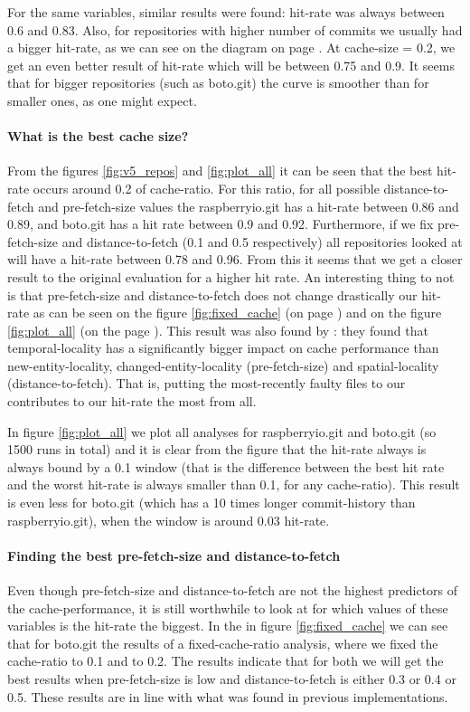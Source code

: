 \documentclass[12pt,twoside,notitlepage]{report}
\begin{document}
For the same variables, similar results were found: hit-rate was always between 0.6 and 0.83. Also, for repositories with higher number of commits we usually had a bigger hit-rate, as we can see on the diagram on page \pageref{fig:v5_repos}. At cache-size = 0.2, we get an even better result of hit-rate which will be between 0.75 and 0.9. It seems that for bigger repositories (such as boto.git) the curve is smoother than for smaller ones, as one might expect.
\paragraph{What is the best cache size?}
From the figures \ref{fig:v5_repos} and \ref{fig:plot_all} it can be seen that the best hit-rate occurs around 0.2 of cache-ratio. For this ratio, for all possible distance-to-fetch and pre-fetch-size values the raspberryio.git has a hit-rate between 0.86 and 0.89, and boto.git has a hit rate between 0.9 and 0.92. Furthermore, if we fix pre-fetch-size and distance-to-fetch (0.1 and 0.5 respectively) all repositories looked at will have a hit-rate between 0.78 and 0.96. From this it seems that we get a closer result to the original evaluation for a higher hit rate.
An interesting thing to not is that		 pre-fetch-size and distance-to-fetch does not change drastically our hit-rate as can be seen on the figure \ref{fig:fixed_cache} (on page \pageref{fig:fixed_cache}) and on the figure \ref{fig:plot_all} (on the page \pageref{fig:plot_all}). This result was also found by \cite{Bugcache}: they found that temporal-locality has a significantly bigger impact on cache performance than new-entity-locality, changed-entity-locality (pre-fetch-size) and spatial-locality (distance-to-fetch). That is, putting the most-recently faulty files to our contributes to our hit-rate the most from all.

In figure \ref{fig:plot_all} we plot all analyses for raspberryio.git and boto.git (so 1500 runs in total) and it is clear from the figure that the hit-rate always is always bound by a 0.1 window (that is the difference between the best hit rate and the worst hit-rate is always smaller than 0.1, for any cache-ratio). This result is even less for boto.git (which has a 10 times longer commit-history than raspberryio.git), when the window is around 0.03 hit-rate.
\paragraph{Finding the best pre-fetch-size and distance-to-fetch} Even though pre-fetch-size and distance-to-fetch are not the highest predictors of the cache-performance, it is still worthwhile to look at for which values of these variables is the hit-rate the biggest.
In the in figure \ref{fig:fixed_cache} we can see that for boto.git the results of a fixed-cache-ratio analysis, where we fixed the cache-ratio to 0.1 and to 0.2. The results indicate that for both we will get the best results when pre-fetch-size is low and distance-to-fetch is either 0.3 or 0.4 or 0.5. These results are in line with what was found in previous implementations\cite{FixCache}.
\end{document}
